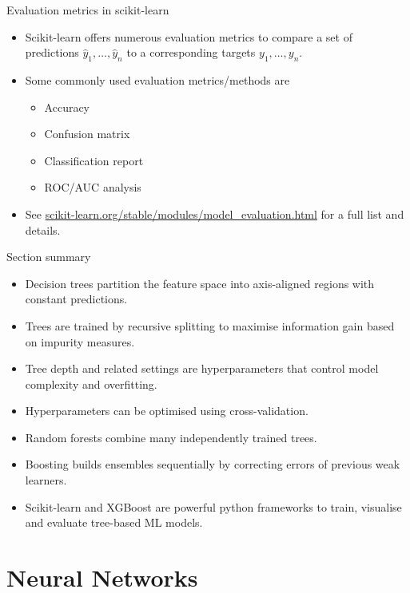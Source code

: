 \documentclass{beamer}
\begin{document}
\begin{frame}{Evaluation metrics in scikit-learn}
\begin{itemize}
\item Scikit-learn offers numerous evaluation metrics to compare a set of predictions \(\hat{y}_1,\dots,\hat{y}_n\) to a corresponding targets \(y_1,\dots,y_n\).
\item Some commonly used evaluation metrics/methods are
\begin{itemize}
\item Accuracy
\item Confusion matrix
\item Classification report
\item ROC/AUC analysis
\end{itemize}
\item See \url{scikit-learn.org/stable/modules/model_evaluation.html} for a full list and details.
\end{itemize}
\end{frame}



\begin{frame}{Section summary}
\begin{itemize}
\item Decision trees partition the feature space into axis-aligned regions with constant predictions.
\item Trees are trained by recursive splitting to maximise information gain based on impurity measures.
\item Tree depth and related settings are hyperparameters that control model complexity and overfitting.
\item Hyperparameters can be optimised using cross-validation.
\item Random forests combine many independently trained trees.
\item Boosting builds ensembles sequentially by correcting errors of previous weak learners.
\item Scikit-learn and XGBoost are powerful python frameworks to train, visualise and evaluate tree-based ML models.
\end{itemize}
\end{frame}



\section{Neural Networks}
\end{document}
